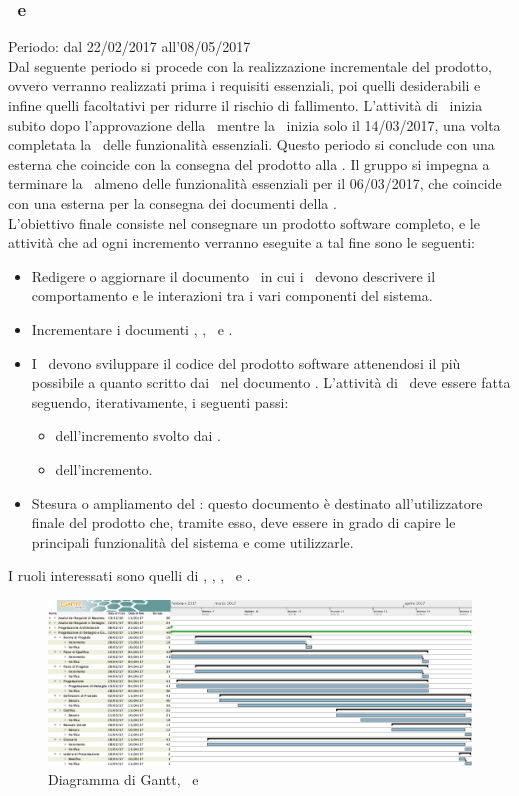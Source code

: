 \subsubsection{\PD\ e \COD}
Periodo: dal 22/02/2017 all'08/05/2017\\

Dal seguente periodo si procede con la realizzazione incrementale del prodotto, ovvero verranno realizzati prima i requisiti essenziali, poi quelli desiderabili e infine quelli facoltativi per ridurre il rischio di fallimento. 
L'attività di \PD\ inizia subito dopo l'approvazione della \PA\ mentre la \COD\ inizia solo il 14/03/2017, una volta completata la \PD\ delle funzionalità essenziali. Questo periodo si conclude con una  esterna che coincide con la consegna del prodotto alla \RQ.
Il gruppo si impegna a terminare la \PD\ almeno delle funzionalità essenziali per il 06/03/2017, che coincide con una  esterna per la consegna dei documenti della \RP.\\
L'obiettivo finale consiste nel consegnare un prodotto software completo, e le attività che ad ogni incremento verranno eseguite a tal fine sono le seguenti:
\begin{itemize}
\item Redigere o aggiornare il documento \DDP\ in cui i \ProgP\ devono descrivere il comportamento e le interazioni tra i vari componenti del sistema.
\item Incrementare i documenti \NdP, \PdP, \PdQ\ e \Gl.
\item I \ProgrP\ devono sviluppare il codice del prodotto software attenendosi il più possibile a quanto scritto dai \ProgP\ nel documento \DDP. L'attività di \COD\ deve essere fatta seguendo, iterativamente, i seguenti passi:
			\begin{itemize}
				\item {} dell'incremento svolto dai \ProgP.
				\item {} dell'incremento.
			\end{itemize}
\item Stesura o ampliamento del \MU: questo documento è destinato all'utilizzatore finale del prodotto che, tramite esso, deve essere in grado di capire le principali funzionalità del sistema e come utilizzarle.
\end{itemize}

I ruoli interessati sono quelli di \Am, \Pm, \Prog, \Progr\ e \Ver.

 \begin{figure}[H]
	\centering 
	\includegraphics[scale=0.3]{Immagini/Gantt/COD.png}
	\caption{Diagramma di Gantt, \PD\ e \COD}
\end{figure}
\newpage
